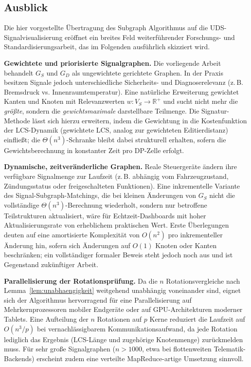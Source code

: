 ﻿\documentclass[a4paper,12pt]{article}
\theoremstyle{definition}
\begin{document}
\subsection{Ausblick}

Die hier vorgestellte Übertragung des Subgraph Algorithmus auf die UDS-Signalvisualisierung eröffnet ein breites Feld weiterführender Forschungs- und Standardisierungsarbeit, das im Folgenden ausführlich skizziert wird.

\textbf{Gewichtete und priorisierte Signalgraphen.} Die vorliegende Arbeit behandelt $G_S$ und $G_D$ als ungewichtete gerichtete Graphen. In der Praxis besitzen Signale jedoch unterschiedliche Sicherheits- und Diagnoserelevanz (z.\,B. Bremsdruck vs. Innenraumtemperatur). Eine natürliche Erweiterung gewichtet Kanten und Knoten mit Relevanzwerten $w: V_S \to \mathbb{R}^+$ und sucht nicht mehr die \emph{größte}, sondern die \emph{gewichtsmaximale} darstellbare Teilmenge. Die Signatur-Methode lässt sich hierzu erweitern, indem die Gewichtung in die Kostenfunktion der LCS-Dynamik (gewichtete LCS, analog zur gewichteten Editierdistanz) einfließt; die $\Theta(n^3)$-Schranke bleibt dabei strukturell erhalten, sofern die Gewichtsberechnung in konstanter Zeit pro DP-Zelle erfolgt.

\textbf{Dynamische, zeitveränderliche Graphen.} Reale Steuergeräte ändern ihre verfügbare Signalmenge zur Laufzeit (z.\,B. abhängig vom Fahrzeugzustand, Zündungsstatus oder freigeschalteten Funktionen). Eine inkrementelle Variante des Signal-Subgraph-Matchings, die bei kleinen Änderungen von $G_S$ nicht die vollständige $\Theta(n^3)$-Berechnung wiederholt, sondern nur betroffene Teilstrukturen aktualisiert, wäre für Echtzeit-Dashboards mit hoher Aktualisierungsrate von erheblichem praktischen Wert. Erste Überlegungen deuten auf eine amortisierte Komplexität von $O(n^2)$ pro inkrementeller Änderung hin, sofern sich Änderungen auf $O(1)$ Knoten oder Kanten beschränken; ein vollständiger formaler Beweis steht jedoch noch aus und ist Gegenstand zukünftiger Arbeit.

\textbf{Parallelisierung der Rotationsprüfung.} Da die $n$ Rotationsvergleiche nach Lemma~\ref{lem:unabhaengigkeit} weitgehend unabhängig voneinander sind, eignet sich der Algorithmus hervorragend für eine Parallelisierung auf Mehrkernprozessoren mobiler Endgeräte oder auf GPU-Architekturen moderner Tablets. Eine Aufteilung der $n$ Rotationen auf $p$ Kerne reduziert die Laufzeit auf $O(n^3/p)$ bei vernachlässigbarem Kommunikationsaufwand, da jede Rotation lediglich das Ergebnis (LCS-Länge und zugehörige Knotenmenge) zurückmelden muss. Für sehr große Signalgraphen ($n > 1000$, etwa bei flottenweiten Telematik-Backends) erscheint zudem eine verteilte MapReduce-artige Umsetzung sinnvoll.
\end{document}
